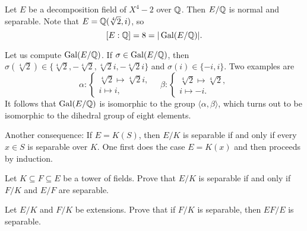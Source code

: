 \begin{example}
    Let $E$ be a decomposition field of $X^4-2$ over $\mathbb{Q}$. 
    Then $E/\mathbb{Q}$ is normal and separable. Note that
    $E=\mathbb{Q}(\sqrt[4]{2},i)$, so 
    \[
    [E:\mathbb{Q}]=8=|\operatorname{Gal}(E/\mathbb{Q})|.
    \]
    
    Let us compute
    $\operatorname{Gal}(E/\mathbb{Q})$. If $\sigma\in\operatorname{Gal}(E/\mathbb{Q})$, then 
    $\sigma(\sqrt[4]{2})\in\{\sqrt[4]{2},-\sqrt[4]{2},\sqrt[4]{2}i,-\sqrt[4]{2}i\}$ and 
    $\sigma(i)\in\{-i,i\}$. Two examples are 
    \[
    \alpha\colon\begin{cases}
    \sqrt[4]{2}\mapsto\sqrt[4]{2}i,\\
    i\mapsto i,
    \end{cases}
    \quad
    \beta\colon\begin{cases}
    \sqrt[4]{2}\mapsto\sqrt[4]{2},\\
    i\mapsto -i.
    \end{cases}
    \]
    It follows that 
    $\operatorname{Gal}(E/\mathbb{Q})$ is isomorphic to the group $\langle\alpha,\beta\rangle$, which turns out to be
    isomorphic to the dihedral group
    of eight elements. 
\end{example}

Another consequence: If $E=K(S)$, then $E/K$ is separable if and only if
every $x\in S$ is separable over $K$. One first does the case $E=K(x)$ 
and then proceeds by induction. 

\begin{exercise}
\label{xca:separable1}
    Let $K\subseteq F\subseteq E$ be a tower of fields. Prove that 
    $E/K$ is separable if and only if $F/K$ and $E/F$ are separable. 
\end{exercise}



\begin{exercise}
\label{xca:separable2}
    Let $E/K$ and $F/K$ be extensions. Prove that if $F/K$ is separable, 
    then $EF/E$ is separable. 
\end{exercise}


